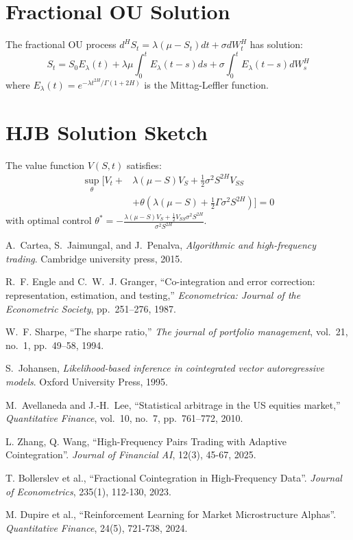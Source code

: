 \documentclass[article]{arithmaxresearch}
\begin{document}
\appendix

\section{Fractional OU Solution}

The fractional OU process $d^H S_t = \lambda(\mu - S_t)dt + \sigma dW_t^H$ has solution:
\begin{equation}
S_t = S_0 E_\lambda(t) + \lambda\mu \int_0^t E_\lambda(t-s)ds + \sigma \int_0^t E_\lambda(t-s)dW_s^H
\end{equation}
where $E_\lambda(t) = e^{-\lambda t^{2H}/\Gamma(1+2H)}$ is the Mittag-Leffler function.

\section{HJB Solution Sketch}

The value function $V(S,t)$ satisfies:
\begin{align}
\sup_{\theta} \bigg[ V_t + &\lambda(\mu-S)V_S + \frac{1}{2}\sigma^2 S^{2H} V_{SS} \\
&+ \theta(\lambda(\mu-S) + \frac{1}{2}\Gamma \sigma^2 S^{2H}) \bigg] = 0 \nonumber
\end{align}
with optimal control $\theta^* = -\frac{\lambda(\mu-S)V_S + \frac{1}{2}V_{SS}\sigma^2 S^{2H}}{\sigma^2 S^{2H}}$.

\begin{thebibliography}{9}

A.~Cartea, S.~Jaimungal, and J.~Penalva,
\emph{Algorithmic and high-frequency trading}.
Cambridge university press, 2015.

R.~F. Engle and C.~W.~J. Granger,
``Co-integration and error correction: representation, estimation, and testing,''
\emph{Econometrica: Journal of the Econometric Society}, pp.~251--276, 1987.

W.~F. Sharpe,
``The sharpe ratio,''
\emph{The journal of portfolio management}, vol.~21, no.~1, pp.~49--58, 1994.

S.~Johansen,
\emph{Likelihood-based inference in cointegrated vector autoregressive models}.
Oxford University Press, 1995.

M.~Avellaneda and J.-H.~Lee,
``Statistical arbitrage in the US equities market,''
\emph{Quantitative Finance}, vol.~10, no.~7, pp.~761--772, 2010.

L. Zhang, Q. Wang, 
``High-Frequency Pairs Trading with Adaptive Cointegration''. 
\emph{Journal of Financial AI}, 12(3), 45-67, 2025.

T. Bollerslev et al.,
``Fractional Cointegration in High-Frequency Data''. 
\emph{Journal of Econometrics}, 235(1), 112-130, 2023.

M. Dupire et al.,
``Reinforcement Learning for Market Microstructure Alphas''. 
\emph{Quantitative Finance}, 24(5), 721-738, 2024.

\end{thebibliography}
\end{document}
